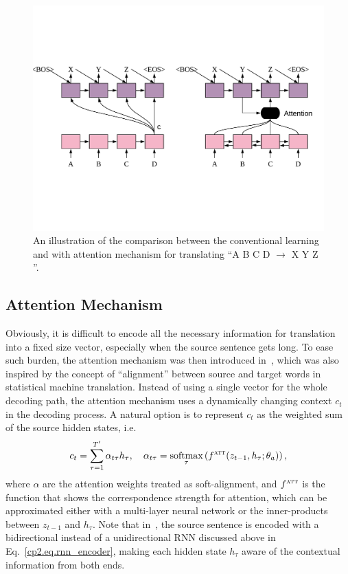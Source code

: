 \begin{figure}
    \centering
    \includegraphics[width=\textwidth]{figs/background/s2s_att.pdf}
    \caption{An illustration of the comparison between the conventional \sts learning and \sts with attention mechanism for translating ``A B C D $\rightarrow$ X Y Z ''.}
    \label{cp2.fig.comparison}
\end{figure}

\subsection{Attention Mechanism}
Obviously, it is difficult to encode all the necessary information for translation into a fixed size vector, especially when the source sentence gets long. 
To ease such burden, the attention mechanism was then introduced in~, which was also inspired by the concept of ``alignment'' between source and target words in statistical machine translation. Instead of using a single vector for the whole decoding path, the attention mechanism uses a dynamically changing context $c_t$ in the decoding process. A natural option is to represent $c_t$ as the weighted sum of the source hidden states, i.e.
\begin{equation} 
    \label{cp2.eq.att}
	c_t = \sum_{\tau=1}^{T'}{\alpha_{t\tau} h_{\tau}}, \quad \alpha_{t\tau} =  \mathop{\operatorname{\text{softmax}}}\limits_\tau\left(f^{\textsc{att}}(z_{t-1}, h_{\tau}; \theta_a)\right),
\end{equation}
where $\alpha$ are the attention weights treated as soft-alignment, and $f^{\textsc{att}}$ is the function that shows the correspondence strength for attention, which can be approximated either with a multi-layer neural network or the inner-products between $z_{t-1}$ and $h_\tau$. 
Note that in~, the source sentence is encoded with a bidirectional instead of a unidirectional RNN discussed above in Eq.~\ref{cp2.eq.rnn_encoder}, making each hidden state $h_{\tau}$ aware of the contextual information from both ends. 

